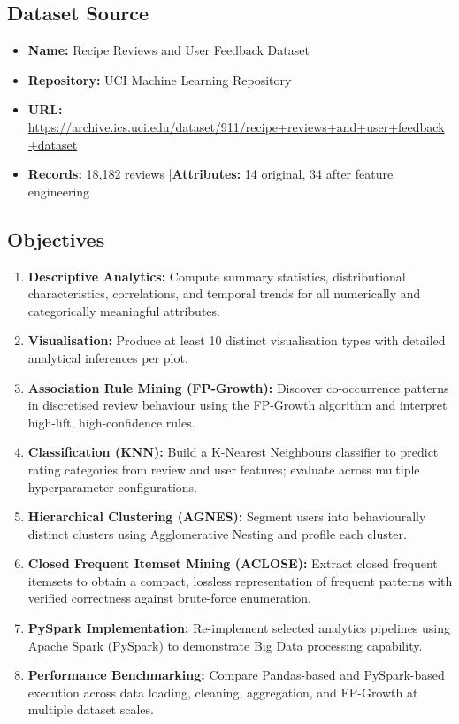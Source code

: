 \documentclass[12pt,a4paper]{article}
\begin{document}
\subsection{Dataset Source}

\begin{itemize}[nosep]
    \item \textbf{Name:} Recipe Reviews and User Feedback Dataset
    \item \textbf{Repository:} UCI Machine Learning Repository
    \item \textbf{URL:} \url{https://archive.ics.uci.edu/dataset/911/recipe+reviews+and+user+feedback+dataset}
    \item \textbf{Records:} 18{,}182 reviews \quad|\quad \textbf{Attributes:} 14 original, 34 after feature engineering
\end{itemize}

\subsection{Objectives}

\begin{enumerate}[nosep]
    \item \textbf{Descriptive Analytics:} Compute summary statistics, distributional characteristics, correlations, and temporal trends for all numerically and categorically meaningful attributes.
    \item \textbf{Visualisation:} Produce at least 10 distinct visualisation types with detailed analytical inferences per plot.
    \item \textbf{Association Rule Mining (FP-Growth):} Discover co-occurrence patterns in discretised review behaviour using the FP-Growth algorithm and interpret high-lift, high-confidence rules.
    \item \textbf{Classification (KNN):} Build a K-Nearest Neighbours classifier to predict rating categories from review and user features; evaluate across multiple hyperparameter configurations.
    \item \textbf{Hierarchical Clustering (AGNES):} Segment users into behaviourally distinct clusters using Agglomerative Nesting and profile each cluster.
    \item \textbf{Closed Frequent Itemset Mining (ACLOSE):} Extract closed frequent itemsets to obtain a compact, lossless representation of frequent patterns with verified correctness against brute-force enumeration.
    \item \textbf{PySpark Implementation:} Re-implement selected analytics pipelines using Apache Spark (PySpark) to demonstrate Big Data processing capability.
    \item \textbf{Performance Benchmarking:} Compare Pandas-based and PySpark-based execution across data loading, cleaning, aggregation, and FP-Growth at multiple dataset scales.
\end{enumerate}
\end{document}
